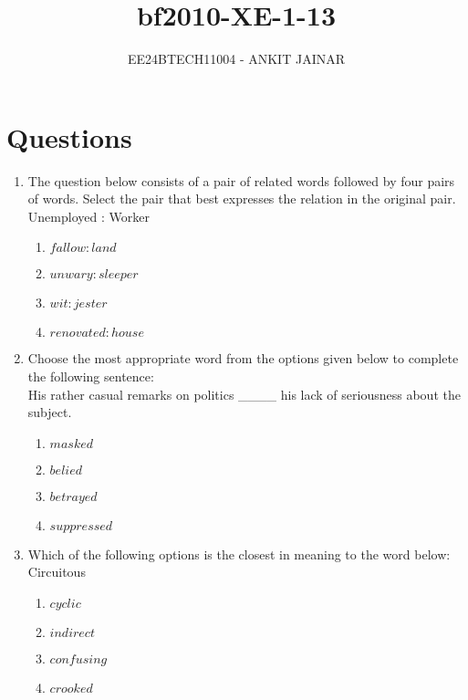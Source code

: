 \documentclass[journal,12pt,onecolumn]{IEEEtran}
\theoremstyle{remark}
\begin{document}

\vspace{3cm}

\title{bf{2010-XE-1-13}}
\author{EE24BTECH11004 - ANKIT JAINAR}
\maketitle
\bigskip

\renewcommand{\thefigure}{\theenumi}
\renewcommand{\thetable}{\theenumi}
\setlength{\columnsep}{2.5em}


\section*{Questions}

\begin{enumerate}
\item The question below consists of a pair of related words followed by four pairs of words. Select the pair that best expresses the relation in the original pair. \\
    {Unemployed : Worker}
    \begin{enumerate}
        \item $  fallow : land $
        \item $  unwary : sleeper $
        \item $  wit : jester $
        \item $  renovated : house $
    \end{enumerate}

    \item Choose the most appropriate word from the options given below to complete the following sentence: \\
    {His rather casual remarks on politics \_\_\_\_ his lack of seriousness about the subject.}
    \begin{enumerate}
        \item $  {masked} $
        \item $  {belied} $
        \item $  {betrayed} $
        \item $  {suppressed} $
    \end{enumerate}

\item Which of the following options is the closest in meaning to the word below: \\
    {Circuitous}
    \begin{enumerate}
        \item $  {cyclic} $
        \item $  {indirect} $
        \item $  {confusing} $
        \item $  {crooked} $
    \end{enumerate}


\end{enumerate}
\end{document}
